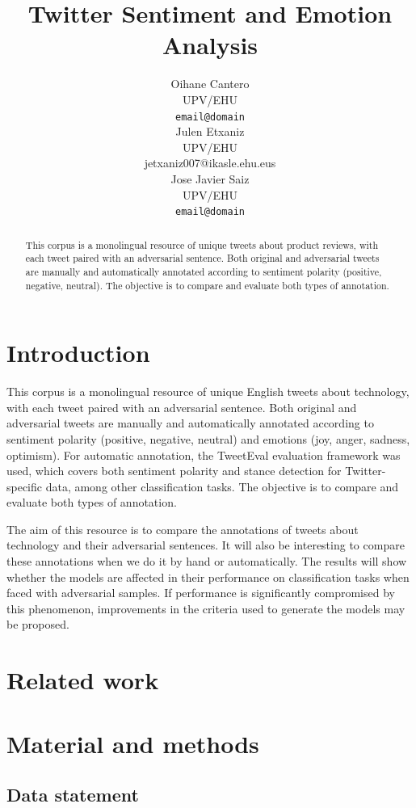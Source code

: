 \documentclass[11pt,a4paper]{article}
\title{Twitter Sentiment and Emotion Analysis}
\author{Oihane Cantero \\
  UPV/EHU \\
  \texttt{email@domain} \\\And
  Julen Etxaniz \\
  UPV/EHU \\
  jetxaniz007@ikasle.ehu.eus \\\And
  Jose Javier Saiz \\
  UPV/EHU \\
  \texttt{email@domain} \\}
\date{}
\begin{document}
\maketitle
\begin{abstract}
This corpus is a monolingual resource of unique tweets about product reviews, with each tweet paired with an adversarial sentence. Both original and adversarial tweets are manually and automatically annotated according to sentiment polarity (positive, negative, neutral). The objective is to compare and evaluate both types of annotation.
\end{abstract}

\section{Introduction}

This corpus is a monolingual resource of unique English tweets about technology, with each tweet paired with an adversarial sentence. Both original and adversarial tweets are manually and automatically annotated according to sentiment polarity (positive, negative, neutral) and emotions (joy, anger, sadness, optimism). For automatic annotation, the TweetEval \cite{barbieri-etal-2020-tweeteval} evaluation framework  was used, which covers both sentiment polarity and stance detection for Twitter-specific data, among other classification tasks. The objective is to compare and evaluate both types of annotation.

The aim of this resource is to compare the annotations of tweets about technology and their adversarial sentences. It will also be interesting to compare these annotations when we do it by hand or automatically. The results will show whether the models are affected in their performance on classification tasks when faced with adversarial samples. If performance is significantly compromised by this phenomenon, improvements in the criteria used to generate the models may be proposed.

\section{Related work}

\section{Material and methods}

\subsection{Data statement}
\end{document}
